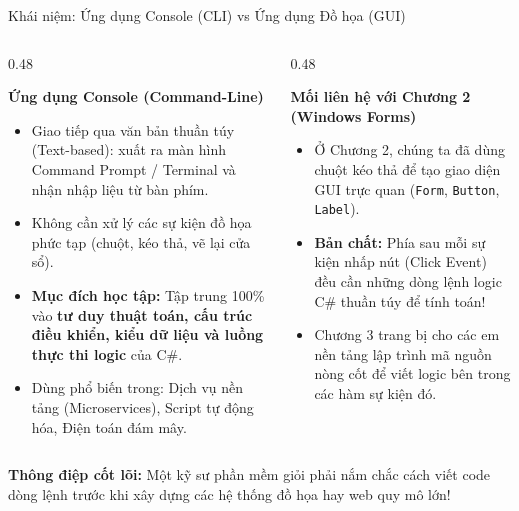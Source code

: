 \documentclass[aspectratio=169, 10pt]{beamer}
\begin{document}
\begin{frame}{Khái niệm: Ứng dụng Console (CLI) vs Ứng dụng Đồ họa (GUI)}
  \begin{columns}[T]
    \begin{column}{0.48\textwidth}
      \begin{block}{\textbf{Ứng dụng Console (Command-Line)}}
        \begin{itemize}\small
          \item Giao tiếp qua văn bản thuần túy (Text-based): xuất ra màn hình Command Prompt / Terminal và nhận nhập liệu từ bàn phím.
          \item Không cần xử lý các sự kiện đồ họa phức tạp (chuột, kéo thả, vẽ lại cửa sổ).
          \item \textbf{Mục đích học tập:} Tập trung 100\% vào \textbf{tư duy thuật toán, cấu trúc điều khiển, kiểu dữ liệu và luồng thực thi logic} của C\#.
          \item Dùng phổ biến trong: Dịch vụ nền tảng (Microservices), Script tự động hóa, Điện toán đám mây.
        \end{itemize}
      \end{block}
    \end{column}

    \begin{column}{0.48\textwidth}
      \begin{exampleblock}{\textbf{Mối liên hệ với Chương 2 (Windows Forms)}}
        \begin{itemize}\small
          \item Ở Chương 2, chúng ta đã dùng chuột kéo thả để tạo giao diện GUI trực quan (\texttt{Form}, \texttt{Button}, \texttt{Label}).
          \item \textbf{Bản chất:} Phía sau mỗi sự kiện nhấp nút (Click Event) đều cần những dòng lệnh logic C\# thuần túy để tính toán!
          \item Chương 3 trang bị cho các em nền tảng lập trình mã nguồn nòng cốt để viết logic bên trong các hàm sự kiện đó.
        \end{itemize}
      \end{exampleblock}
    \end{column}
  \end{columns}
  \vspace{2mm}
  \begin{alertblock}{\textbf{Thông điệp cốt lõi:}}
    Một kỹ sư phần mềm giỏi phải nắm chắc cách viết code dòng lệnh trước khi xây dựng các hệ thống đồ họa hay web quy mô lớn!
  \end{alertblock}
\end{frame}
\end{document}
